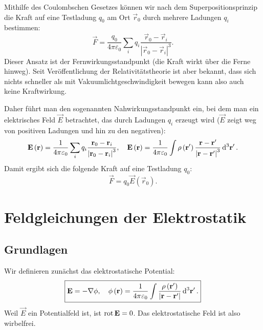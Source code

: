Mithilfe des Coulombschen Gesetzes können wir nach dem Superpositionsprinzip die Kraft auf eine Testladung $q_{0}$ am Ort $\vec {r}_{0}$ durch mehrere Ladungen $q_{i}$ bestimmen:
\begin{equation}
	\label{3.2}
	\vec {F}=\frac{q_{0}}{4\pi \varepsilon _{0}}\sum _{i}q_{i}\frac{\vec {r}_{0}-\vec {r}_{i}}{\left| \vec {r}_{0}-\vec {r}_{i}\right| ^{3}}.
\end{equation}
Dieser Ansatz ist der Fernwirkungsstandpunkt (die Kraft wirkt über die Ferne hinweg). Seit Veröffentlichung der Relativitätstheorie ist aber bekannt, dass sich nichts schneller als mit Vakuumlichtgeschwindigkeit bewegen kann \textendash{} also auch keine Kraftwirkung.

Daher führt man den sogenannten Nahwirkungsstandpunkt ein, bei dem man ein elektrisches Feld $\vec {E}$ betrachtet, das durch Ladungen $q_{i}$ erzeugt wird ($\vec {E}$ zeigt weg von positiven Ladungen und hin zu den negativen):
\begin{equation}
	\vec {E}\left(\vec {r}\right)=\frac{1}{4\pi \varepsilon _{0}}\sum _{i}q_{i}\frac{\vec {r}_{0}-\vec {r}_{i}}{\left| \vec {r}_{0}-\vec {r}_{i}\right| ^{3}},\quad \vec {E}\left(\vec {r}\right)=\frac{1}{4\pi \varepsilon _{0}}\int \rho \left(\vec {r}'\right)\frac{\vec {r}-\vec {r}'}{\left| \vec {r}-\vec {r}'\right| ^{3}}\diffa[3]{\vec{r}'}.
\end{equation}
Damit ergibt sich die folgende Kraft auf eine Testladung $q_{0}$:
\begin{equation}
	\vec {F}=q_{0}\vec {E}\left(\vec {r}_{0}\right).
\end{equation}


\section{Feldgleichungen der Elektrostatik}

\subsection{Grundlagen}

Wir definieren zunächst das elektrostatische Potential:
\begin{equation}
	\label{3.3}
	\boxed{\vec {E}=-\nabla \phi ,\quad \phi \left(\vec {r}\right)=\frac{1}{4\pi \varepsilon _{0}}\int \frac{\rho \left(\vec {r}'\right)}{\left| \vec {r}-\vec {r}'\right| }\diffa[3]{\vec{r}'}.}
\end{equation}
Weil $\vec {E}$ ein Potentialfeld ist, ist $\rot \vec {E}=0$. Das elektrostatische Feld ist also wirbelfrei.


